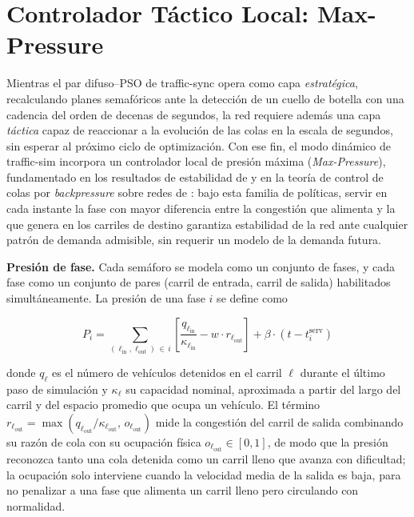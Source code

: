 \section{Controlador Táctico Local: Max-Pressure}
\label{subsec:traffic_sim_maxpressure}

Mientras el par difuso--PSO de traffic-sync opera como capa \emph{estratégica}, recalculando planes semafóricos ante la detección de un cuello de botella con una cadencia del orden de decenas de segundos, la red requiere además una capa \emph{táctica} capaz de reaccionar a la evolución de las colas en la escala de segundos, sin esperar al próximo ciclo de optimización. Con ese fin, el modo dinámico de traffic-sim incorpora un controlador local de presión máxima (\emph{Max-Pressure}), fundamentado en los resultados de estabilidad de \cite{varaiya2013max} y en la teoría de control de colas por \emph{backpressure} sobre redes de \cite{tassiulas1992stability}: bajo esta familia de políticas, servir en cada instante la fase con mayor diferencia entre la congestión que alimenta y la que genera en los carriles de destino garantiza estabilidad de la red ante cualquier patrón de demanda admisible, sin requerir un modelo de la demanda futura.

\textbf{Presión de fase.} Cada semáforo se modela como un conjunto de fases, y cada fase como un conjunto de pares (carril de entrada, carril de salida) habilitados simultáneamente. La presión de una fase $i$ se define como

\begin{equation}
P_i = \sum_{(\ell_\text{in}, \ell_\text{out}) \,\in\, i} \left[ \frac{q_{\ell_\text{in}}}{\kappa_{\ell_\text{in}}} - w \cdot r_{\ell_\text{out}} \right] + \beta \cdot (t - t_i^{\text{serv}})
\label{eq:max_pressure}
\end{equation}

donde $q_{\ell}$ es el número de vehículos detenidos en el carril $\ell$ durante el último paso de simulación y $\kappa_{\ell}$ su capacidad nominal, aproximada a partir del largo del carril y del espacio promedio que ocupa un vehículo. El término $r_{\ell_\text{out}} = \max(q_{\ell_\text{out}}/\kappa_{\ell_\text{out}}, \, o_{\ell_\text{out}})$ mide la congestión del carril de salida combinando su razón de cola con su ocupación física $o_{\ell_\text{out}} \in [0,1]$, de modo que la presión reconozca tanto una cola detenida como un carril lleno que avanza con dificultad; la ocupación solo interviene cuando la velocidad media de la salida es baja, para no penalizar a una fase que alimenta un carril lleno pero circulando con normalidad. 

